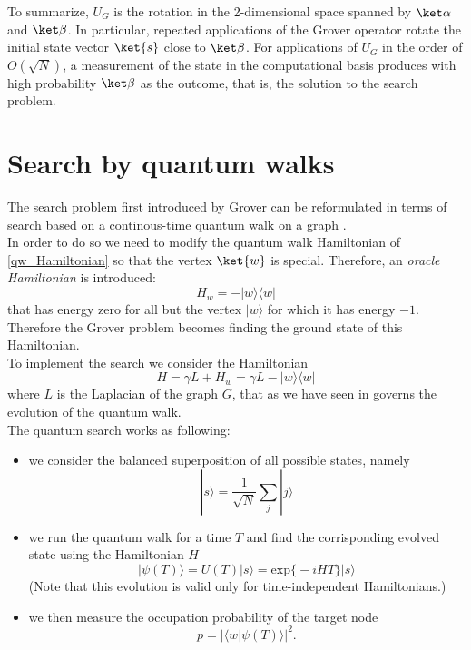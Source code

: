 \noindent
To summarize, $U_G$ is the rotation in the 2-dimensional space spanned by $\kalpha$ and $\kbeta$. In particular, repeated applications of the Grover operator rotate the initial state vector $\ket{s}$ close to $\kbeta$. For applications of $U_G$ in the order of $O(\sqrt{N})$, a measurement of the state in the computational basis produces with high probability $\kbeta$ as the outcome, that is, the solution to the search problem.


\section{Search by quantum walks}\label{sec:search quantum walk}
The search problem first introduced by Grover can be reformulated in terms of search based on a continous-time quantum walk on a graph \cite{Childs2004}. \\In order to do so we need to modify the quantum walk Hamiltonian of \cref{qw_Hamiltonian} so that the vertex $\ket{w}$ is special. Therefore, an \textit{oracle Hamiltonian} is introduced:
\begin{equation}
  H_w = -|w\rangle\langle w|
\end{equation}
that has energy zero for all but the vertex $|w\rangle$ for which it has energy $-1$. Therefore the Grover problem becomes finding the ground state of this Hamiltonian. \\To implement the search we consider the Hamiltonian
\begin{equation}
  H = \gamma L + H_w = \gamma L -|w\rangle\langle w|
\end{equation}
where $L$ is the Laplacian of the graph $G$, that as we have seen in  governs the evolution of the quantum walk.\\
The quantum search works as following:
\begin{itemize}
  \item we consider the balanced superposition of all possible states, namely
  \begin{equation}
    |s\rangle = \frac{1}{\sqrt{N}}\sum_j|j\rangle
  \end{equation}

  \item we run the quantum walk for a time $T$ and find the corrisponding evolved state using the Hamiltonian $H$
  \begin{equation}
  |\psi(T)\rangle = U(T)|s\rangle  = \mbox{exp}\Big\{-iHT\Big\}|s\rangle
  \end{equation}
  (Note that this evolution is valid only for time-independent Hamiltonians.)

  \item we then measure the occupation probability of the target node
  \begin{equation}
    p = |\langle w|\psi(T)\rangle|^2.
  \end{equation}

\end{itemize}
